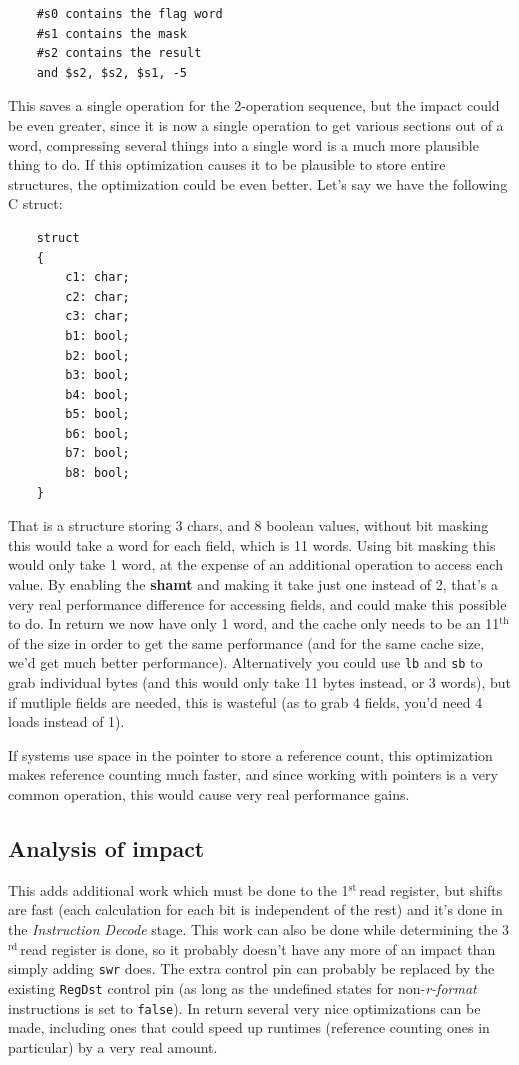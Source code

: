 \documentclass[11pt]{article} %
\newcommand{\strong}[1]{\textbf{#1}}
\newcommand{\code}[1]{\texttt{#1}}
\newcommand{\st}{$^{\text{st}\ }$}
\newcommand{\rd}{$^{\text{rd}\ }$}
\newcommand{\nth}{$^{\text{th}\ }$}
\begin{document}
\begin{verbatim}
    #s0 contains the flag word
    #s1 contains the mask
    #s2 contains the result
    and $s2, $s2, $s1, -5
\end{verbatim}

This saves a single operation for the 2-operation sequence, but the impact could be even greater, since it is now a single operation to get various sections out of a word, compressing several things into a single word is a much more plausible thing to do. If this optimization causes it to be plausible to store entire structures, the optimization could be even better. Let's say we have the following C struct:

\begin{verbatim}
    struct
    {
        c1: char;
        c2: char;
        c3: char;
        b1: bool;
        b2: bool;
        b3: bool;
        b4: bool;
        b5: bool;
        b6: bool;
        b7: bool;
        b8: bool;
    }
\end{verbatim}

That is a structure storing 3 chars, and 8 boolean values, without bit masking this would take a word for each field, which is 11 words. Using bit masking this would only take 1 word, at the expense of an additional operation to access each value. By enabling the \strong{shamt} and making it take just one instead of 2, that's a very real performance difference for accessing fields, and could make this possible to do. In return we now have only 1 word, and the cache only needs to be an 11\nth of the size in order to get the same performance (and for the same cache size, we'd get much better performance). Alternatively you could use \code{lb} and \code{sb} to grab individual bytes (and this would only take 11 bytes instead, or 3 words), but if mutliple fields are needed, this is wasteful (as to grab 4 fields, you'd need 4 loads instead of 1). 

If systems use space in the pointer to store a reference count, this optimization makes reference counting much faster, and since working with pointers is a very common operation, this would cause very real performance gains.

\subsection{Analysis of impact}

This adds additional work which must be done to the 1\st read register, but shifts are fast (each calculation for each bit is independent of the rest) and it's done in the \emph{Instruction Decode} stage. This work can also be done while determining the 3\rd read register is done, so it probably doesn't have any more of an impact than simply adding \code{swr} does. The extra control pin can probably be replaced by the existing \code{RegDst} control pin (as long as the undefined states for non-\emph{r-format} instructions is set to \code{false}). In return several very nice optimizations can be made, including ones that could speed up runtimes (reference counting ones in particular) by a very real amount.
\end{document}
